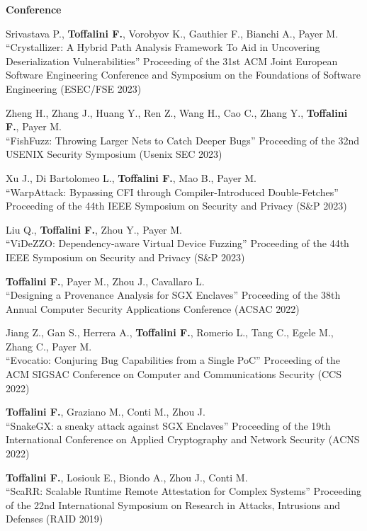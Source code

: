 \textbf{Conference}\begin{enumerate}[label={[C\arabic*]},leftmargin=5mm]
\item Srivastava P., \textbf{Toffalini F.}, Vorobyov K., Gauthier F., Bianchi A., Payer M.\\``Crystallizer: A Hybrid Path Analysis Framework To Aid in Uncovering Deserialization Vulnerabilities'' Proceeding of the 31st ACM Joint European Software Engineering Conference and Symposium on the Foundations of Software Engineering (ESEC/FSE 2023)
\item Zheng H., Zhang J., Huang Y., Ren Z., Wang H., Cao C., Zhang Y., \textbf{Toffalini F.}, Payer M.\\``FishFuzz: Throwing Larger Nets to Catch Deeper Bugs'' Proceeding of the 32nd USENIX Security Symposium (Usenix SEC 2023)
\item Xu J., Di Bartolomeo L., \textbf{Toffalini F.}, Mao B., Payer M.\\``WarpAttack: Bypassing CFI through Compiler-Introduced Double-Fetches'' Proceeding of the 44th IEEE Symposium on Security and Privacy (S\&P 2023)
\item Liu Q., \textbf{Toffalini F.}, Zhou Y., Payer M.\\``ViDeZZO: Dependency-aware Virtual Device Fuzzing'' Proceeding of the 44th IEEE Symposium on Security and Privacy (S\&P 2023)
\item \textbf{Toffalini F.}, Payer M., Zhou J., Cavallaro L.\\``Designing a Provenance Analysis for SGX Enclaves'' Proceeding of the 38th Annual Computer Security Applications Conference (ACSAC 2022)
\item Jiang Z., Gan S., Herrera A., \textbf{Toffalini F.}, Romerio L., Tang C., Egele M., Zhang C., Payer M.\\``Evocatio: Conjuring Bug Capabilities from a Single PoC'' Proceeding of the ACM SIGSAC Conference on Computer and Communications Security (CCS 2022)
\item \textbf{Toffalini F.}, Graziano M., Conti M., Zhou J.\\``SnakeGX: a sneaky attack against SGX Enclaves'' Proceeding of the 19th International Conference on Applied Cryptography and Network Security (ACNS 2022)
\item \textbf{Toffalini F.}, Losiouk E., Biondo A., Zhou J., Conti M.\\``ScaRR: Scalable Runtime Remote Attestation for Complex Systems'' Proceeding of the 22nd International Symposium on Research in Attacks, Intrusions and Defenses (RAID 2019)

\end{enumerate}
